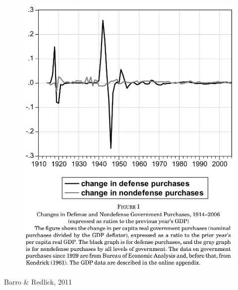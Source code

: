 \documentclass{beamer}
\begin{document}
\begin{frame}
  \begin{figure}
    \includegraphics[scale=.5]{barro_redlick1.eps}
  \end{figure}
  Barro \& Redlick, 2011
\end{frame}
\end{document}
